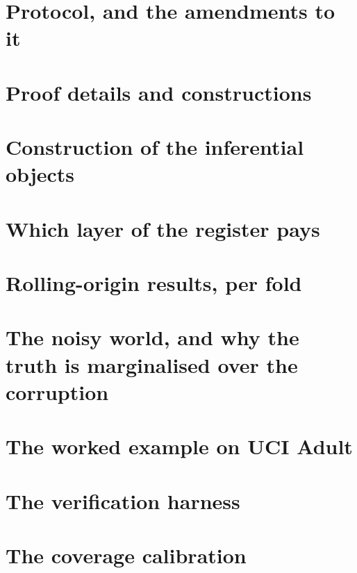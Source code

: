 \section{Protocol, and the amendments to it}
\label{app:protocol}


\section{Proof details and constructions}
\label{app:props}


\section{Construction of the inferential objects}
\label{app:objects}


\section{Which layer of the register pays}
\label{app:layers}


\section{Rolling-origin results, per fold}
\label{app:rolling}


\section{The noisy world, and why the truth is marginalised over the corruption}
\label{app:noisy}


\section{The worked example on UCI Adult}
\label{app:worked}


\section{The verification harness}
\label{app:verifier}


\section{The coverage calibration}
\label{app:calibration}


